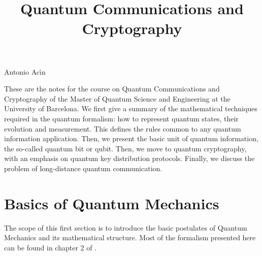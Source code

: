 \documentclass[a4paper]{article}
\begin{document}
\title{ Quantum Communications and Cryptography
 }


\maketitle

\begin{center}
Antonio Ac\'\i n
\end{center}


These are the notes for the course on Quantum Communications and Cryptography of the Master of Quantum Science and Engineering at the University of Barcelona. We first give a summary of the mathematical
techniques required in the quantum formalism: how to represent
quantum states, their evolution and measurement. This defines the
rules common to any quantum information application. Then, we
present the basic unit of quantum information, the so-called quantum bit or
qubit. Then, we move to quantum cryptography, with an emphasis on quantum key distribution protocols. Finally, we discuss the problem of
long-distance quantum communication.

\section{Basics of Quantum Mechanics}

The scope of this first section is to introduce the basic
postulates of Quantum Mechanics and its mathematical structure.
Most of the formalism presented here can be found in chapter 2 of
\cite{NC}.
\end{document}
